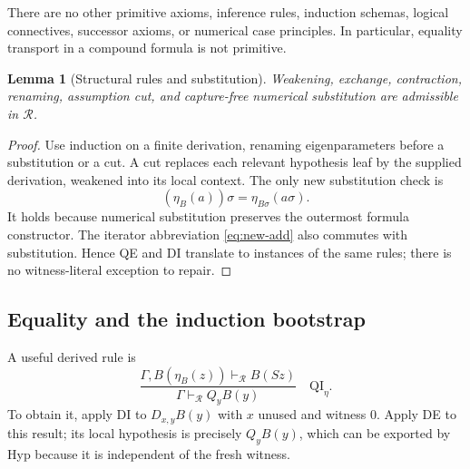 \documentclass[11pt,a4paper]{article}
\newtheorem{lemma}[theorem]{Lemma}
\theoremstyle{definition}\newtheorem{definition}[theorem]{Definition}
\begin{document}
There are no other primitive axioms, inference rules, induction schemas,
logical connectives, successor axioms, or numerical case principles.
In particular, equality transport in a compound formula is not primitive.

\begin{lemma}[Structural rules and substitution]
\label{lem:new-structural}
Weakening, exchange, contraction, renaming, assumption cut, and capture-free
numerical substitution are admissible in $\mathcal R$.
\end{lemma}
\begin{proof}
Use induction on a finite derivation, renaming eigenparameters before a
substitution or a cut.  A cut replaces each relevant hypothesis leaf by the
supplied derivation, weakened into its local context.  The only new
substitution check is
\[
 (\eta_B(a))\sigma=\eta_{B\sigma}(a\sigma).
\]
It holds because numerical substitution preserves the outermost formula
constructor.  The iterator abbreviation \eqref{eq:new-add} also commutes with
substitution.  Hence QE and DI translate to instances of the same rules;
there is no witness-literal exception to repair.
\end{proof}

\subsection{Equality and the induction bootstrap}
\label{subsec:new-bootstrap}

A useful derived rule is
\begin{equation}
 \frac{\Gamma,B(\eta_B(z))\vdash_{\mathcal R}B(Sz)}
      {\Gamma\vdash_{\mathcal R}Q_yB(y)}
 \quad\mathrm{QI}_{\eta}.
 \label{eq:new-qi}
\end{equation}
To obtain it, apply DI to $D_{x,y}B(y)$ with $x$ unused and witness $0$.
Apply DE to this result; its local hypothesis is precisely $Q_yB(y)$, which
can be exported by Hyp because it is independent of the fresh witness.
\end{document}

